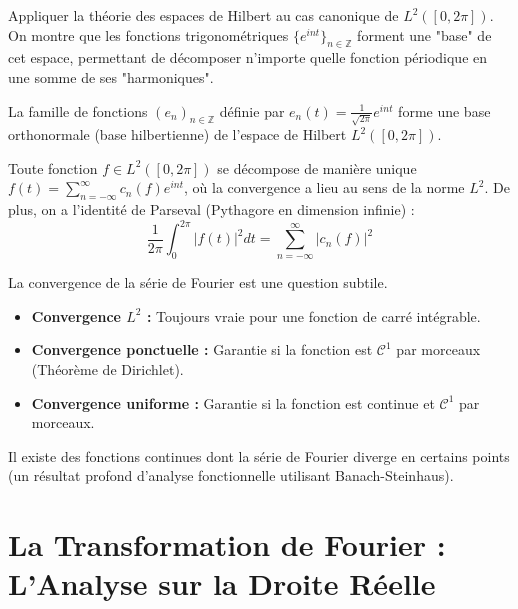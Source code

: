 \begin{objectif}
    Appliquer la théorie des espaces de Hilbert au cas canonique de $L^2([0, 2\pi])$. On montre que les fonctions trigonométriques $\{e^{int}\}_{n \in \mathbb{Z}}$ forment une "base" de cet espace, permettant de décomposer n'importe quelle fonction périodique en une somme de ses "harmoniques".
\end{objectif}

\begin{theorem}
    La famille de fonctions $(e_n)_{n \in \mathbb{Z}}$ définie par $e_n(t) = \frac{1}{\sqrt{2\pi}}e^{int}$ forme une base orthonormale (base hilbertienne) de l'espace de Hilbert $L^2([0, 2\pi])$.
\end{theorem}

\begin{corollary}
    Toute fonction $f \in L^2([0, 2\pi])$ se décompose de manière unique $f(t) = \sum_{n=-\infty}^\infty c_n(f) e^{int}$, où la convergence a lieu au sens de la norme $L^2$. De plus, on a l'identité de Parseval (Pythagore en dimension infinie) :
    $$ \frac{1}{2\pi} \int_0^{2\pi} |f(t)|^2 dt = \sum_{n=-\infty}^\infty |c_n(f)|^2 $$
\end{corollary}

\begin{remark}
    La convergence de la série de Fourier est une question subtile.
    \begin{itemize}
        \item \textbf{Convergence $L^2$ :} Toujours vraie pour une fonction de carré intégrable.
        \item \textbf{Convergence ponctuelle :} Garantie si la fonction est $\mathcal{C}^1$ par morceaux (Théorème de Dirichlet).
        \item \textbf{Convergence uniforme :} Garantie si la fonction est continue et $\mathcal{C}^1$ par morceaux.
    \end{itemize}
    Il existe des fonctions continues dont la série de Fourier diverge en certains points (un résultat profond d'analyse fonctionnelle utilisant Banach-Steinhaus).
\end{remark}

\section{La Transformation de Fourier : L'Analyse sur la Droite Réelle}

